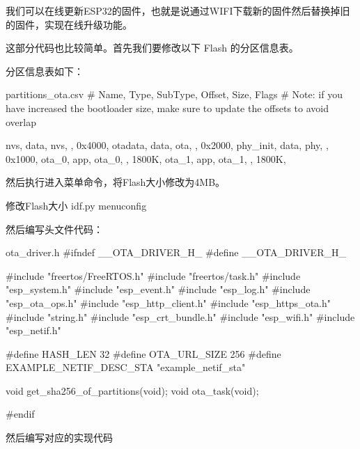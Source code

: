 \documentclass[lang=cn,newtx,10pt,scheme=chinese]{elegantbook}
\begin{document}
我们可以在线更新ESP32的固件，也就是说通过WIFI下载新的固件然后替换掉旧的固件，实现在线升级功能。

这部分代码也比较简单。首先我们要修改以下 Flash 的分区信息表。

分区信息表如下：

\begin{mycode}{partitions\_ota.csv}
# Name,   Type, SubType, Offset,  Size, Flags
# Note: if you have increased the bootloader size, make sure to update the offsets to avoid overlap

nvs,      data, nvs,     ,        0x4000,
otadata,  data, ota,     ,        0x2000,
phy_init, data, phy,     ,        0x1000,
ota_0,    app,  ota_0,   ,        1800K,
ota_1,    app,  ota_1,   ,        1800K,
\end{mycode}

然后执行进入菜单命令，将Flash大小修改为4MB。

\begin{mycode}{修改Flash大小}
idf.py menuconfig
\end{mycode}

然后编写头文件代码：

\begin{mycode}{ota\_driver.h}
#ifndef __OTA_DRIVER_H_
#define __OTA_DRIVER_H_

#include "freertos/FreeRTOS.h"
#include "freertos/task.h"
#include "esp_system.h"
#include "esp_event.h"
#include "esp_log.h"
#include "esp_ota_ops.h"
#include "esp_http_client.h"
#include "esp_https_ota.h"
#include "string.h"
#include "esp_crt_bundle.h"
#include "esp_wifi.h"
#include "esp_netif.h"


#define HASH_LEN 32
#define OTA_URL_SIZE 256
#define EXAMPLE_NETIF_DESC_STA "example_netif_sta"

void get_sha256_of_partitions(void);
void ota_task(void);

#endif
\end{mycode}

然后编写对应的实现代码
\end{document}
